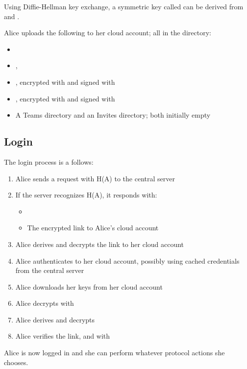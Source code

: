 \documentclass[pldi,10pt,preprint]{sigplanconf-pldi16}
\begin{document}
Using Diffie-Hellman key exchange, a symmetric key called  can be derived from  and .

Alice uploads the following to her cloud account; all in the  directory:

\begin{itemize}
\item {}
\item {}, 
\item {}, encrypted with  and signed with 
\item {}, encrypted with  and signed with 
\item A Teams directory and an Invites directory; both initially empty
\end{itemize}

\subsection{Login}

The login process is a follows:

\begin{enumerate}
\item Alice sends a request with H(A) to the central server
\item If the server recognizes H(A), it responds with:
  \begin{itemize}
  \item {}
  \item The encrypted link to Alice's cloud account
  \end{itemize}
\item Alice derives  and decrypts the link to her cloud account
\item Alice authenticates to her cloud account, possibly using cached credentials from the central server
\item Alice downloads her keys from her cloud account
\item Alice decrypts  with 
\item Alice derives  and decrypts 
\item Alice verifies the link,  and  with 
\end{enumerate}

Alice is now logged in and she can perform whatever protocol actions she chooses.
\end{document}
